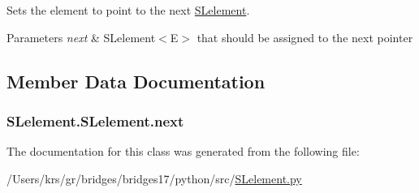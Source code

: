 Sets the element to point to the next \hyperlink{class_s_lelement_1_1_s_lelement}{S\+Lelement}. 


\begin{DoxyParams}{Parameters}
{\em next} & S\+Lelement$<$\+E$>$ that should be assigned to the next pointer \\
\hline
\end{DoxyParams}


\subsection{Member Data Documentation}
\hypertarget{class_s_lelement_1_1_s_lelement_a2d83afedba3b70183c90c3454ac99a29}{}
\subsubsection[{next}]{\setlength{\rightskip}{0pt plus 5cm}S\+Lelement.\+S\+Lelement.\+next}\label{class_s_lelement_1_1_s_lelement_a2d83afedba3b70183c90c3454ac99a29}


The documentation for this class was generated from the following file\+:\begin{DoxyCompactItemize}
\item 
/\+Users/krs/gr/bridges/bridges17/python/src/\hyperlink{_s_lelement_8py}{S\+Lelement.\+py}\end{DoxyCompactItemize}
